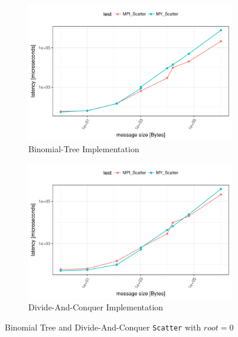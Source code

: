 \begin{figure}[H]
  \centering
  \begin{subfigure}[b]{0.49\textwidth}
        \includegraphics[width=\textwidth]{../benchmarks/openmpi/binom/scatter_32/runtime.pdf}
        \caption{Binomial-Tree Implementation}
    \end{subfigure}
    \begin{subfigure}[b]{0.49\textwidth}
        \includegraphics[width=\textwidth]{../benchmarks/openmpi/divide_conquer/scatter_32/runtime.pdf}
        \caption{Divide-And-Conquer Implementation}
    \end{subfigure}
    \caption{Binomial Tree and Divide-And-Conquer \texttt{Scatter} with $root = 0$}
    \label{fig:scatter:binom_vs_dac:root0}
\end{figure}


